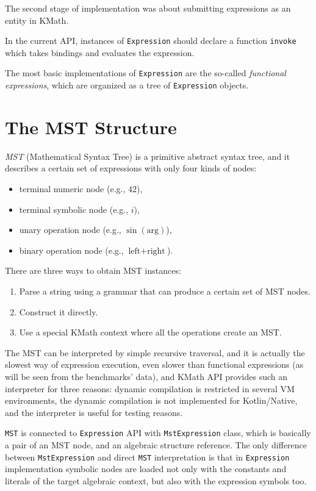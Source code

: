 \documentclass[conference]{IEEEtran}
\begin{document}
The second stage of implementation was about submitting expressions as an entity in KMath.

In the current API, instances of \texttt{Expression} should declare a function \texttt{invoke} which takes bindings and evaluates the expression.

The most basic implementations of \texttt{Expression} are the so-called \textit{functional expressions}, which are organized as a tree of \texttt{Expression} objects.

\section{The MST Structure}
\textit{MST} (Mathematical Syntax Tree) is a primitive abstract syntax tree, and it describes a certain set of expressions with only four kinds of nodes:

\begin{itemize}
    \item terminal numeric node (e.g., $42$),
    \item terminal symbolic node (e.g., $i$),
    \item unary operation node (e.g., $\sin{(\text{arg})}$),
    \item binary operation node (e.g., $\text{left} + \text{right}$).
\end{itemize}

There are three ways to obtain MST instances:

\begin{enumerate}
    \item Parse a string using a grammar that can produce a certain set of MST nodes.
    \item Construct it directly.
    \item Use a special KMath context where all the operations create an MST.
\end{enumerate}

The MST can be interpreted by simple recursive traversal, and it is actually the slowest way of expression execution, even slower than functional expressions (as will be seen from the benchmarks' data), and KMath API provides such an interpreter for three reasons: dynamic compilation is restricted in several VM environments, the dynamic compilation is not implemented for Kotlin/Native, and the interpreter is useful for testing reasons.

\texttt{MST} is connected to \texttt{Expression} API with \texttt{MstExpression} class, which is basically a pair of an MST node, and an algebraic structure reference. The only difference between \texttt{MstExpression} and direct \texttt{MST} interpretation is that in \texttt{Expression} implementation symbolic nodes are loaded not only with the constants and literals of the target algebraic context, but also with the expression symbols too.
\end{document}
